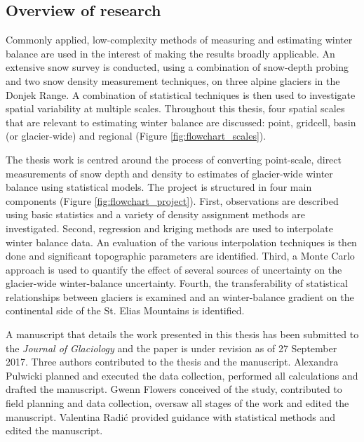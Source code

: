 \documentclass{sfuthesis}
\begin{document}
\subsection{Overview of research}

Commonly applied, low-complexity methods of measuring and estimating winter balance are used in the interest of making the results broadly applicable. An extensive snow survey is conducted, using a combination of snow-depth probing and two snow density measurement techniques, on three alpine glaciers in the Donjek Range. A combination of statistical techniques is then used to investigate spatial variability at multiple scales. Throughout this thesis, four spatial scales that are relevant to estimating winter balance are discussed: point, gridcell, basin (or glacier-wide) and regional (Figure \ref{fig:flowchart_scales}). 

The thesis work is centred around the process of converting point-scale, direct measurements of snow depth and density to estimates of glacier-wide winter balance using statistical models. The project is structured in four main components (Figure \ref{fig:flowchart_project}). First, observations are described using basic statistics and a variety of density assignment methods are investigated. Second, regression and kriging methods are used to interpolate winter balance data. An evaluation of the various interpolation techniques is then done and significant topographic parameters are identified. Third, a Monte Carlo approach is used to quantify the effect of several sources of uncertainty on the glacier-wide winter-balance uncertainty. Fourth, the transferability of statistical relationships between glaciers is examined and an winter-balance gradient on the continental side of the St. Elias Mountains is identified.

A manuscript that details the work presented in this thesis has been submitted to the \textit{Journal of Glaciology} and the paper is under revision as of 27 September 2017. Three authors contributed to the thesis and the manuscript. Alexandra Pulwicki planned and executed the data collection, performed all calculations and drafted the manuscript. Gwenn Flowers conceived of the study, contributed to field planning and data collection, oversaw all stages of the work and edited the manuscript. Valentina Radi\'c provided guidance with statistical methods and edited the manuscript.
\end{document}
